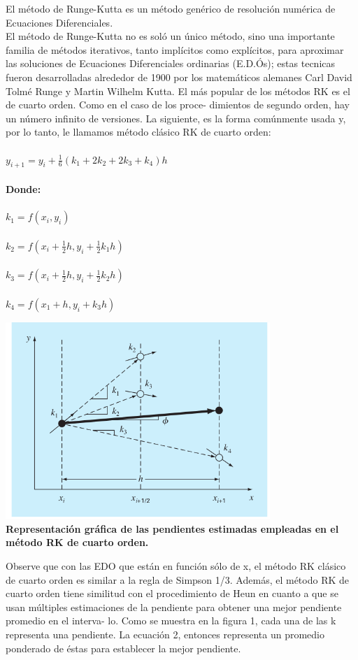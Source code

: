 \documentclass[12pt]{article}
\begin{document}
El método de Runge-Kutta es un método genérico de resolución numérica de Ecuaciones Diferenciales.\\

El método de Runge-Kutta no es soló un único método, sino una importante familia de métodos iterativos, tanto implícitos como explícitos, 
para aproximar las soluciones de Ecuaciones Diferenciales ordinarias (E.D.Ós); estas 
tecnicas fueron desarrolladas alrededor de 1900 por los matemáticos alemanes Carl David Tolmé Runge y Martin Wilhelm Kutta.
El más popular de los métodos RK es el de cuarto orden. Como en el caso de los proce-
dimientos de segundo orden, hay un número infinito de versiones. La siguiente, es la
forma comúnmente usada y, por lo tanto, le llamamos método clásico RK de cuarto
orden:\\
\\
$y_{i+1}=y_i+\frac{1}{6}(k_1+2k_2+2k_3+k_4)h $\\
\\
\textbf{Donde:}\\
\\
$k_1=f({x_i,y_i})$\\
\\
$k_2=f(x_i+\frac{1}{2}h,y_i+\frac{1}{2}k_1h)$\\
\\
$k_3=f(x_i+\frac{1}{2}h,y_i+\frac{1}{2}k_2h)$\\
\\
$k_4=f(x_1+h,y_i+k_3h)$
\begin{center}
  \includegraphics[width=100mm]{images/Figura1.png}\\
  \textbf{Representación gráfica de las pendientes estimadas empleadas en el método RK de cuarto
  orden.}
\end{center}
Observe que con las EDO que están en función sólo de x, el método RK clásico de
cuarto orden es similar a la regla de Simpson 1/3. Además, el método RK de cuarto
orden tiene similitud con el procedimiento de Heun en cuanto a que se usan múltiples
estimaciones de la pendiente para obtener una mejor pendiente promedio en el interva-
lo. Como se muestra en la figura 1, cada una de las k representa una pendiente. La
ecuación 2, entonces representa un promedio ponderado de éstas para establecer
la mejor pendiente.
\end{document}
